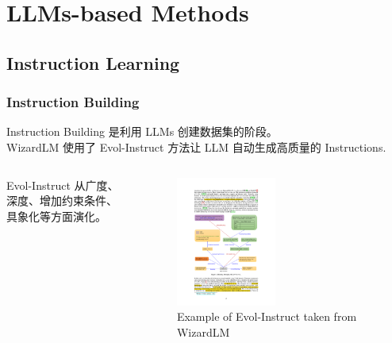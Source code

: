 \section{LLMs-based Methods}
\subsection{Instruction Learning}
\begin{frame}
	\frametitle{Instruction Building}
	\begin{small}
	Instruction Building 是利用 LLMs 创建数据集的阶段。\\ 
	WizardLM 使用了 Evol-Instruct 方法让 LLM 自动生成高质量的 Instructions.
	\end{small}
	\begin{columns}
		\begin{column}{.2\textwidth}
			Evol-Instruct 从广度、深度、增加约束条件、具象化等方面演化。
		\end{column}
		\begin{column}{.8\textwidth}
	\begin{figure}[h]
		\begin{center}
			\includegraphics[width=0.5\textwidth]{pic/WizardLM.pdf}
		\end{center}
		\caption{Example of Evol-Instruct taken from WizardLM}
		\label{Evol-Instruct}
	\end{figure}
\end{column}
\end{columns}
\end{frame}

